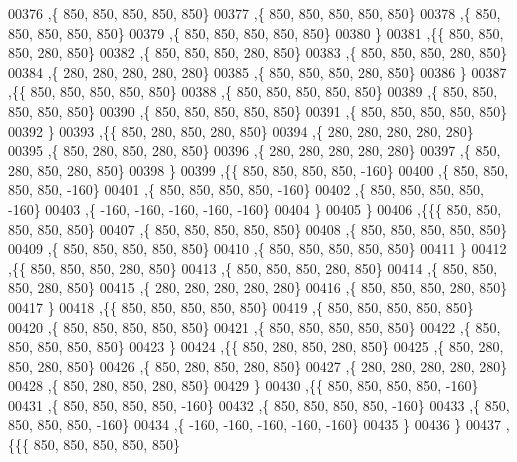 \begin{DoxyCode}
00376    ,\{   850,   850,   850,   850,   850\}
00377    ,\{   850,   850,   850,   850,   850\}
00378    ,\{   850,   850,   850,   850,   850\}
00379    ,\{   850,   850,   850,   850,   850\}
00380    \}
00381   ,\{\{   850,   850,   850,   280,   850\}
00382    ,\{   850,   850,   850,   280,   850\}
00383    ,\{   850,   850,   850,   280,   850\}
00384    ,\{   280,   280,   280,   280,   280\}
00385    ,\{   850,   850,   850,   280,   850\}
00386    \}
00387   ,\{\{   850,   850,   850,   850,   850\}
00388    ,\{   850,   850,   850,   850,   850\}
00389    ,\{   850,   850,   850,   850,   850\}
00390    ,\{   850,   850,   850,   850,   850\}
00391    ,\{   850,   850,   850,   850,   850\}
00392    \}
00393   ,\{\{   850,   280,   850,   280,   850\}
00394    ,\{   280,   280,   280,   280,   280\}
00395    ,\{   850,   280,   850,   280,   850\}
00396    ,\{   280,   280,   280,   280,   280\}
00397    ,\{   850,   280,   850,   280,   850\}
00398    \}
00399   ,\{\{   850,   850,   850,   850,  -160\}
00400    ,\{   850,   850,   850,   850,  -160\}
00401    ,\{   850,   850,   850,   850,  -160\}
00402    ,\{   850,   850,   850,   850,  -160\}
00403    ,\{  -160,  -160,  -160,  -160,  -160\}
00404    \}
00405   \}
00406  ,\{\{\{   850,   850,   850,   850,   850\}
00407    ,\{   850,   850,   850,   850,   850\}
00408    ,\{   850,   850,   850,   850,   850\}
00409    ,\{   850,   850,   850,   850,   850\}
00410    ,\{   850,   850,   850,   850,   850\}
00411    \}
00412   ,\{\{   850,   850,   850,   280,   850\}
00413    ,\{   850,   850,   850,   280,   850\}
00414    ,\{   850,   850,   850,   280,   850\}
00415    ,\{   280,   280,   280,   280,   280\}
00416    ,\{   850,   850,   850,   280,   850\}
00417    \}
00418   ,\{\{   850,   850,   850,   850,   850\}
00419    ,\{   850,   850,   850,   850,   850\}
00420    ,\{   850,   850,   850,   850,   850\}
00421    ,\{   850,   850,   850,   850,   850\}
00422    ,\{   850,   850,   850,   850,   850\}
00423    \}
00424   ,\{\{   850,   280,   850,   280,   850\}
00425    ,\{   850,   280,   850,   280,   850\}
00426    ,\{   850,   280,   850,   280,   850\}
00427    ,\{   280,   280,   280,   280,   280\}
00428    ,\{   850,   280,   850,   280,   850\}
00429    \}
00430   ,\{\{   850,   850,   850,   850,  -160\}
00431    ,\{   850,   850,   850,   850,  -160\}
00432    ,\{   850,   850,   850,   850,  -160\}
00433    ,\{   850,   850,   850,   850,  -160\}
00434    ,\{  -160,  -160,  -160,  -160,  -160\}
00435    \}
00436   \}
00437  ,\{\{\{   850,   850,   850,   850,   850\}

\end{DoxyCode}
